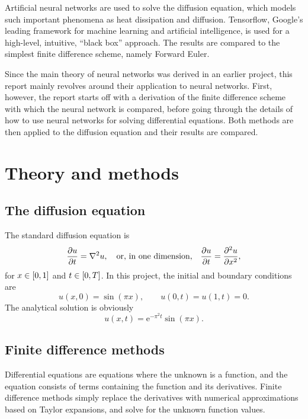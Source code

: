 \documentclass[11pt,british,a4paper]{article}
\renewcommand{\exp}[1]{\mathrm{e}^{#1}}
\numberwithin{equation}{section}
\begin{document}
Artificial neural networks are used to solve the diffusion equation, which models such important phenomena as heat dissipation and diffusion. Tensorflow, Google's leading framework for machine learning and artificial intelligence, is used for a high-level, intuitive, ``black box'' approach. The results are compared to the simplest finite difference scheme, namely Forward Euler.

Since the main theory of neural networks was derived in an earlier project, this report mainly revolves around their application to neural networks. First, however, the report starts off with a derivation of the finite difference scheme with which the neural network is compared, before going through the details of how to use neural networks for solving differential equations. Both methods are then applied to the diffusion equation and their results are compared.

\section{Theory and methods}
\subsection{The diffusion equation}
The standard diffusion equation is
\begin{equation}
    \pdv{u}{t} = \nabla^2 u, \quad \text{or, in one dimension,}\quad \pdv{u}{t} = \pdv[2]{u}{x},
\end{equation}
for \(x\in\qty[0,1]\) and \(t\in\qty[0,T]\). In this project, the initial and boundary conditions are
\begin{equation}
    u(x,0) = \sin(\pi x), \qquad u(0,t) = u(1,t) = 0.
\end{equation}
The analytical solution is obviously
\begin{equation}
    u(x,t) = \exp{-\pi^2 t} \sin(\pi x).
\end{equation}


\subsection{Finite difference methods}
Differential equations are equations where the unknown is a function, and the equation consists of terms containing the function and its derivatives. Finite difference methods simply replace the derivatives with numerical approximations based on Taylor expansions, and solve for the unknown function values.
\end{document}
